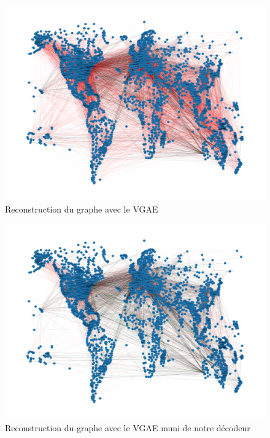 \documentclass{article}
\begin{document}
\begin{figure}[H]
    \centering
    \includegraphics[width=1\linewidth]{../graphiques/withoutDecoder.png}
    \caption{Reconstruction du graphe avec le VGAE}
    \label{fig:fig_graphe_VGAE}
\end{figure}

\begin{figure}[H]
    \centering
    \includegraphics[width=1\linewidth]{../graphiques/withDecoder.png}
    \caption{Reconstruction du graphe avec le VGAE muni de notre décodeur}
    \label{fig:fig_graphe_VGAE_with_decodeur}
\end{figure}
\end{document}
